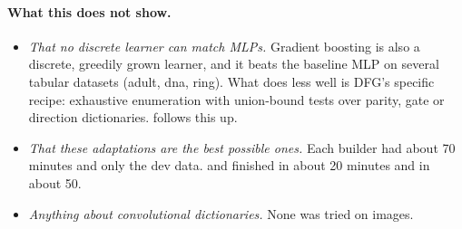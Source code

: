 \paragraph{What this does not show.}
\begin{itemize}
\item \emph{That no discrete learner can match MLPs.} Gradient boosting is also a discrete, greedily grown learner, and it beats the baseline MLP on several tabular datasets (adult, dna, ring). What does less well is DFG's specific recipe: exhaustive enumeration with union-bound tests over parity, gate or direction dictionaries.  follows this up.
\item \emph{That these adaptations are the best possible ones.} Each builder had about 70 minutes and only the dev data.  and  finished in about 20 minutes and  in about 50.
\item \emph{Anything about convolutional dictionaries.} None was tried on images.
\end{itemize}
